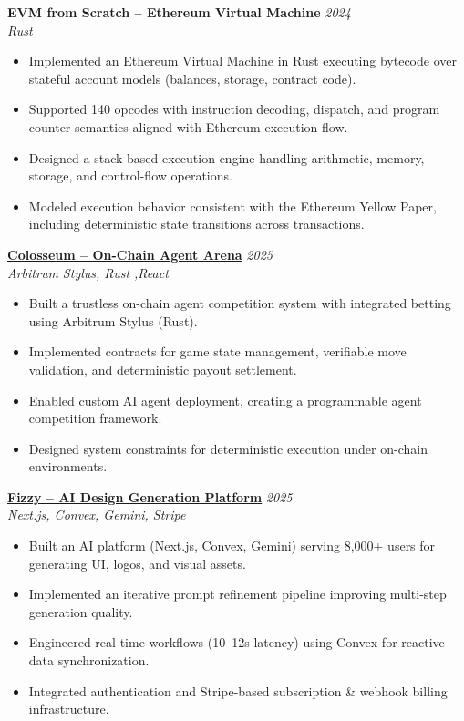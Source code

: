 \documentclass[10pt,a4paper]{article}
\newcommand{\resumeEntry}[3]{
  \noindent\textbf{#1} \hfill \textit{#2} \\   
  \textit{#3} \vspace{-3pt}
}
\newcommand{\entryGap}{\vspace{5pt}}
\begin{document}
\entryGap

\resumeEntry{EVM from Scratch -- Ethereum Virtual Machine}{2024}{Rust}
\begin{itemize}
    \item Implemented an Ethereum Virtual Machine in Rust executing bytecode over stateful account models (balances, storage, contract code).
    \item Supported 140 opcodes with instruction decoding, dispatch, and program counter semantics aligned with Ethereum execution flow.
    \item Designed a stack-based execution engine handling arithmetic, memory, storage, and control-flow operations.
    \item Modeled execution behavior consistent with the Ethereum Yellow Paper, including deterministic state transitions across transactions.
\end{itemize}

\entryGap

\resumeEntry{\href{https://github.com/18aaddy/Agentic-Ethereum}{Colosseum -- On-Chain Agent Arena}}{2025}{Arbitrum Stylus, Rust ,React }
\begin{itemize}
    \item Built a trustless on-chain agent competition system with integrated betting using Arbitrum Stylus (Rust).
    \item Implemented contracts for game state management, verifiable move validation, and deterministic payout settlement.
    \item Enabled custom AI agent deployment, creating a programmable agent competition framework.
    \item Designed system constraints for deterministic execution under on-chain environments.
\end{itemize}

\entryGap

\resumeEntry{\href{https://www.fizzylabs.ai}{Fizzy -- AI Design Generation Platform}}{2025}{Next.js, Convex, Gemini, Stripe}
\begin{itemize}
    \item Built an AI platform (Next.js, Convex, Gemini) serving 8,000+ users for generating UI, logos, and visual assets.
    \item Implemented an iterative prompt refinement pipeline improving multi-step generation quality.
    \item Engineered real-time workflows (10--12s latency) using Convex for reactive data synchronization.
    \item Integrated authentication and Stripe-based subscription \& webhook billing infrastructure.
\end{itemize}
\end{document}

